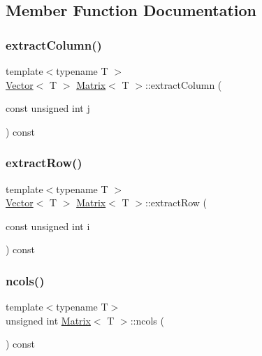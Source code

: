 \subsection{Member Function Documentation}
\mbox{\label{classMatrix_a4361c4478b01f7df1173e5b64eccd127_a4361c4478b01f7df1173e5b64eccd127}} 
\subsubsection{\texorpdfstring{extract\+Column()}{extractColumn()}}
{\footnotesize\ttfamily template$<$typename T $>$ \\
\mbox{\hyperlink{classVector}{Vector}}$<$ T $>$ \mbox{\hyperlink{classMatrix}{Matrix}}$<$ T $>$\+::extract\+Column (\begin{DoxyParamCaption}\item[{const unsigned int}]{j }\end{DoxyParamCaption}) const\hspace{0.3cm}{\ttfamily [inline]}}

\mbox{\label{classMatrix_a7dded77c0f4c424c98858b5f94c13c16_a7dded77c0f4c424c98858b5f94c13c16}} 
\subsubsection{\texorpdfstring{extract\+Row()}{extractRow()}}
{\footnotesize\ttfamily template$<$typename T $>$ \\
\mbox{\hyperlink{classVector}{Vector}}$<$ T $>$ \mbox{\hyperlink{classMatrix}{Matrix}}$<$ T $>$\+::extract\+Row (\begin{DoxyParamCaption}\item[{const unsigned int}]{i }\end{DoxyParamCaption}) const\hspace{0.3cm}{\ttfamily [inline]}}

\mbox{\label{classMatrix_aa62107f075998f969b39fcb1bef20c44_aa62107f075998f969b39fcb1bef20c44}} 
\subsubsection{\texorpdfstring{ncols()}{ncols()}}
{\footnotesize\ttfamily template$<$typename T$>$ \\
unsigned int \mbox{\hyperlink{classMatrix}{Matrix}}$<$ T $>$\+::ncols (\begin{DoxyParamCaption}{ }\end{DoxyParamCaption}) const\hspace{0.3cm}{\ttfamily [inline]}}

